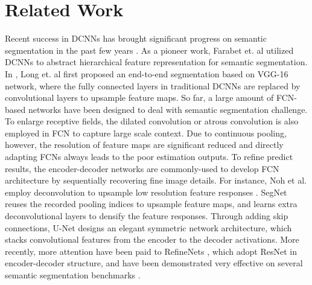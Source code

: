 \documentclass[runningheads]{llncs}
\begin{document}
\section{Related Work}\label{sec:RleatedWork}

Recent success in DCNNs has brought significant progress on semantic segmentation in the past few years \cite{girshick2014rich,long2017fully,Chen2016deeplab,zhao2017pyramid}. As a pioneer work, Farabet et. al \cite{farabet2013learning} utilized DCNNs to abstract hierarchical feature representation for semantic segmentation. In \cite{long2017fully}, Long et. al first proposed an end-to-end segmentation based on VGG-16 network, where the fully connected layers in traditional DCNNs are replaced by convolutional layers to upsample feature maps. So far, a large amount of FCN-based networks \cite{Chen2016deeplab,zhao2017pyramid,xiao2017not,understand2018wang,Chen2017rethinking} have been designed to deal with semantic segmentation challenge. To enlarge receptive fields, the dilated convolution \cite{yu2015multi} or atrous convolution \cite{Chen2016deeplab,Chen2017rethinking} is also employed in FCN to capture large scale context. Due to continuous pooling, however, the resolution of feature maps are significant reduced and directly adapting FCNs always leads to the poor estimation outputs. To refine predict results, the encoder-decoder networks \cite{Badrinarayanan2015Segnet,Guosheng2017RefineNet,noh2015learning,chao2017large} are commonly-used to develop FCN architecture by sequentially recovering fine image details. For instance, Noh et al. employ deconvolution to upsample low resolution feature responses \cite{noh2015learning}. SegNet \cite{Badrinarayanan2015Segnet} reuses the recorded pooling indices to upsample feature maps, and learns extra deconvolutional layers to densify the feature responses. Through adding skip connections, U-Net \cite{olaf2015unet} designs an elegant symmetric network architecture, which stacks convolutional features from the encoder to the decoder activations. More recently, more attention have been paid to RefineNets \cite{Guosheng2017RefineNet,chao2017large,tobias2017full,md2017gate}, which adopt ResNet \cite{he2016deep} in encoder-decoder structure, and have been demonstrated very effective on several semantic segmentation benchmarks \cite{Cordts2016the,everingham2015pascal}.
\end{document}

